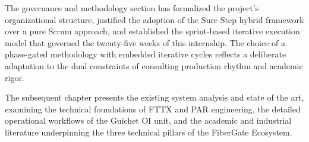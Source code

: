 The governance and methodology section has formalized the project's organizational structure, justified the adoption of the Sure Step hybrid framework over a pure Scrum approach, and established the sprint-based iterative execution model that governed the twenty-five weeks of this internship. The choice of a phase-gated methodology with embedded iterative cycles reflects a deliberate adaptation to the dual constraints of consulting production rhythm and academic rigor.

The subsequent chapter presents the existing system analysis and state of the art, examining the technical foundations of FTTX and PAR engineering, the detailed operational workflows of the Guichet OI unit, and the academic and industrial literature underpinning the three technical pillars of the FiberGate Ecosystem.
